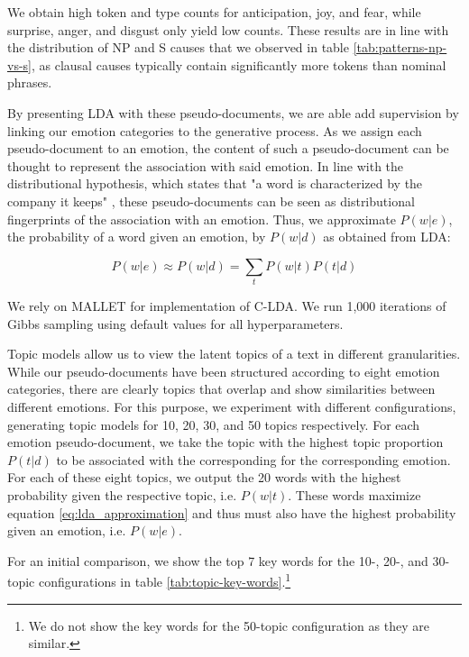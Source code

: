 We obtain high token and type counts for anticipation, joy, and fear, while surprise, anger, and disgust only yield low counts. These results are in line with the distribution of NP and S causes that we observed in table \ref{tab:patterns-np-vs-s}, as clausal causes typically contain significantly more tokens than nominal phrases.

By presenting LDA with these pseudo-documents, we are able add supervision by linking our emotion categories to the generative process. As we assign each pseudo-document to an emotion, the content of such a pseudo-document can be thought to represent the association with said emotion. In line with the distributional hypothesis, which states that "a word is characterized by the company it keeps" \cite{firth}, these pseudo-documents can be seen as distributional fingerprints of the association with an emotion. Thus, we approximate $P(w|e)$, the probability of a word given an emotion, by $P(w|d)$ as obtained from LDA:

\begin{equation} \label{eq:lda_approximation}
P(w|e) \approx P(w|d) = \sum_t P(w|t) P(t|d)
\end{equation}

We rely on MALLET \cite{mallet} for implementation of C-LDA. We run 1,000 iterations of Gibbs sampling using default values for all hyperparameters.

Topic models allow us to view the latent topics of a text in different granularities. While our pseudo-documents have been structured according to eight emotion categories, there are clearly topics that overlap and show similarities between different emotions. For this purpose, we experiment with different configurations, generating topic models for 10, 20, 30, and 50 topics respectively. For each emotion pseudo-document, we take the topic with the highest topic proportion $P(t|d)$ to be associated with the corresponding for the corresponding emotion. For each of these eight topics, we output the 20 words with the highest probability given the respective topic, i.e. $P(w|t)$. These words maximize equation \ref{eq:lda_approximation} and thus must also have the highest probability given an emotion, i.e. $P(w|e)$.

For an initial comparison, we show the top 7 key words for the 10-, 20-, and 30-topic configurations in table \ref{tab:topic-key-words}.\footnote{We do not show the key words for the 50-topic configuration as they are similar.}

